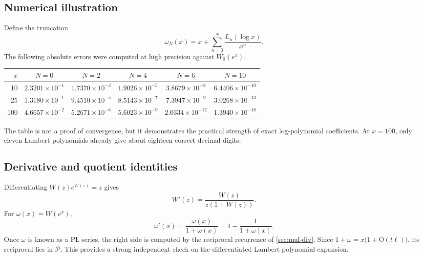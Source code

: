 \documentclass[11pt,oneside]{article}
\numberwithin{equation}{section}
\theoremstyle{definition}
\newcommand{\PL}{\mathscr P}
\newcommand{\bigO}{\mathrm{O}}
\begin{document}
\subsection{Numerical illustration}

Define the truncation
\begin{equation}\label{eq:omega-N}
  \omega_N(x)=x+\sum_{n=0}^N\frac{L_n(\log x)}{x^n}.
\end{equation}
The following absolute errors were computed at high precision against
\(W_0(e^x)\).

\begin{center}
\begin{tabular}{@{}rccccc@{}}
\toprule
\(x\)&\(N=0\)&\(N=2\)&\(N=4\)&\(N=6\)&\(N=10\)\\
\midrule
10  &\(2.3201\!\times10^{-1}\)&\(1.7370\!\times10^{-3}\)&\(1.9026\!\times10^{-5}\)&\(3.8679\!\times10^{-8}\)&\(6.4406\!\times10^{-10}\)\\
25  &\(1.3180\!\times10^{-1}\)&\(9.4510\!\times10^{-5}\)&\(8.5143\!\times10^{-7}\)&\(7.3947\!\times10^{-9}\)&\(3.0268\!\times10^{-13}\)\\
100 &\(4.6657\!\times10^{-2}\)&\(5.2671\!\times10^{-6}\)&\(5.6023\!\times10^{-9}\)&\(2.0334\!\times10^{-12}\)&\(1.3940\!\times10^{-18}\)\\
\bottomrule
\end{tabular}
\end{center}

The table is not a proof of convergence, but it demonstrates the practical
strength of exact log-polynomial coefficients.  At \(x=100\), only eleven
Lambert polynomials already give about eighteen correct decimal digits.

\subsection{Derivative and quotient identities}

Differentiating \(W(z)e^{W(z)}=z\) gives
\begin{equation}\label{eq:W-derivative}
  W'(z)=\frac{W(z)}{z(1+W(z))}.
\end{equation}
For \(\omega(x)=W(e^x)\),
\begin{equation}\label{eq:omega-derivative}
  \omega'(x)=\frac{\omega(x)}{1+\omega(x)}
  =1-\frac{1}{1+\omega(x)}.
\end{equation}
Once \(\omega\) is known as a PL series, the right side is computed by the
reciprocal recurrence of \cref{sec:mul-div}.  Since
\(1+\omega=x\bigl(1+\bigO(t\ell)\bigr)\), its reciprocal lies in \(\PL\).
This provides a strong independent check on the differentiated Lambert
polynomial expansion.
\end{document}
